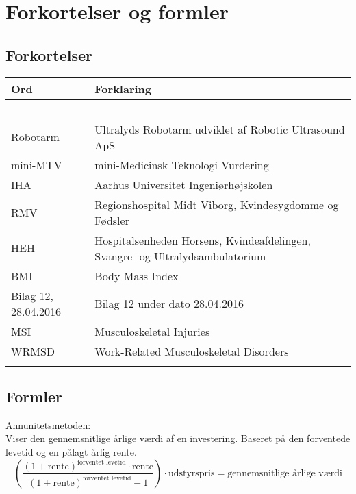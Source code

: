 \chapter{Forkortelser og formler}

\section{Forkortelser}
\begin{longtabu} to 
    Ord &    Forklaring\\
    \toprule\ \\
    Robotarm & Ultralyds Robotarm udviklet af Robotic Ultrasound ApS \\
    mini-MTV & mini-Medicinsk Teknologi Vurdering \\
    IHA & Aarhus Universitet Ingeniørhøjskolen \\
  	RMV & Regionshospital Midt Viborg, Kvindesygdomme og Fødsler \\
  	HEH & Hospitalsenheden Horsens, Kvindeafdelingen, Svangre- og Ultralydsambulatorium \\
  	BMI & Body Mass Index \\
  	Bilag 12, 28.04.2016 & Bilag 12 under dato 28.04.2016 \\
  	MSI & Musculoskeletal Injuries \\
  	WRMSD & Work-Related Musculoskeletal Disorders \\
   
\label{forkort}
\end{longtabu}

\section{Formler} \label{Formler}
Annunitetsmetoden: \\
Viser den gennemsnitlige årlige værdi af en investering. Baseret på den forventede levetid og en pålagt årlig rente.
\begin{equation}
\left( \dfrac{(1+\text{rente})^{\text{forventet levetid}}\cdot \text{rente}}{(1+\text{rente})^{\text{forventet levetid}}-1}\right)\cdot \text{udstyrspris} = \text{gennemsnitlige årlige værdi}
\end{equation}